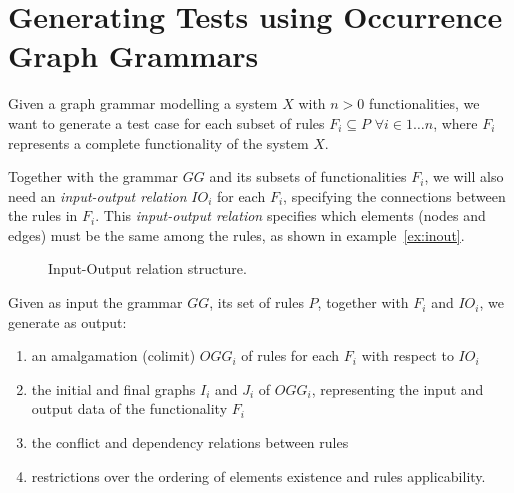 \section{Generating Tests using Occurrence Graph Grammars}

Given a graph grammar \graphGrammar{} modelling a system $X$ with $n > 0$ functionalities, we want to generate a test case for each subset of rules $F_i \subseteq P$ $\forall i \in 1\ldots n$, where $F_i$ represents a complete functionality  of the system $X$.

Together with the grammar $GG$ and its subsets of functionalities $F_i$, we will also need an \emph{input-output relation} $IO_i$ for each $F_i$, specifying the connections between the rules in $F_i$. This \emph{input-output relation} specifies which elements (nodes and edges) must be the same among the rules, as shown in example~\ref{ex:inout}.

\begin{example}\label{ex:inout}


\begin{figure}[!ht]
  \centering
  \caption{Input-Output relation structure.}\label{fig:tests:inout}
\end{figure}

\end{example}

Given as input the grammar $GG$, its set of rules $P$, together with $F_i$ and $IO_i$, we generate as output:

\begin{enumerate}
\item an amalgamation (colimit) $OGG_i$ of rules for each $F_i$ with respect to $IO_i$
\item the initial and final graphs $I_i$ and $J_i$ of $OGG_i$, representing the input and output data of the functionality $F_i$
\item the conflict and dependency relations between rules 
\item restrictions over the ordering of elements existence and rules applicability.
\end{enumerate}

